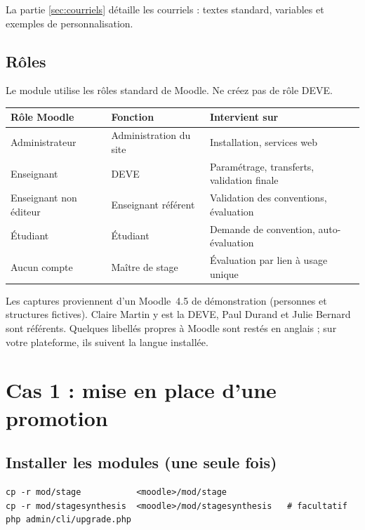\documentclass[11pt,a4paper]{article}
\begin{document}
La partie \ref{sec:courriels} détaille les courriels : textes standard,
variables et exemples de personnalisation.

\subsection{Rôles}

Le module utilise les rôles standard de Moodle. Ne créez pas de rôle
\og DEVE\fg{}.

\begin{center}
\begin{tabularx}{\linewidth}{@{}l l X@{}}
\toprule
\textbf{Rôle Moodle} & \textbf{Fonction} & \textbf{Intervient sur} \\
\midrule
Administrateur & Administration du site & Installation, services web \\
Enseignant & DEVE & Paramétrage, transferts, validation finale \\
Enseignant non éditeur & Enseignant référent & Validation des conventions, évaluation \\
Étudiant & Étudiant & Demande de convention, auto-évaluation \\
Aucun compte & Maître de stage & Évaluation par lien à usage unique \\
\bottomrule
\end{tabularx}
\end{center}

Les captures proviennent d'un Moodle~4.5 de démonstration (personnes et
structures fictives). Claire Martin y est la DEVE, Paul Durand et Julie Bernard
sont référents. Quelques libellés propres à Moodle sont restés en anglais ; sur
votre plateforme, ils suivent la langue installée.

\section{Cas 1 : mise en place d'une promotion}
\label{sec:cas1}

\subsection{Installer les modules (une seule fois)}
\label{sec:installation}

\begin{verbatim}
cp -r mod/stage           <moodle>/mod/stage
cp -r mod/stagesynthesis  <moodle>/mod/stagesynthesis   # facultatif
php admin/cli/upgrade.php
\end{verbatim}
\end{document}
